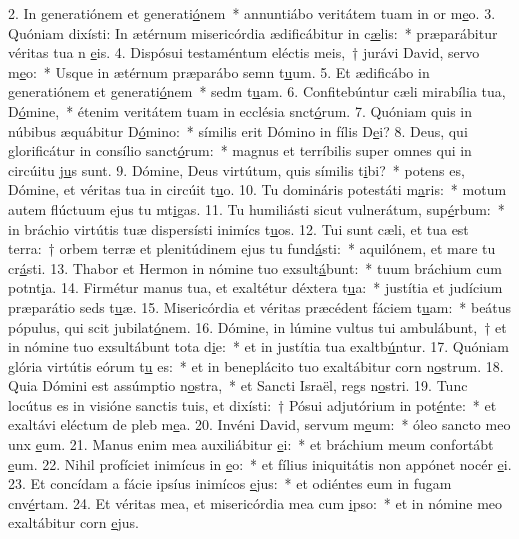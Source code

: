 2. In generatiónem et generati\uline{ó}nem~* annuntiábo veritátem tuam in or m\uline{e}o.
3. Quóniam dixísti: In ætérnum misericórdia ædificábitur in c\uline{æ}lis:~* præparábitur véritas tua n \uline{e}is.
4. Dispósui testaméntum eléctis meis,~† jurávi David, servo m\uline{e}o:~* Usque in ætérnum præparábo semn t\uline{u}um.
5. Et ædificábo in generatiónem et generati\uline{ó}nem~* sedm t\uline{u}am.
6. Confitebúntur cæli mirabília tua, D\uline{ó}mine,~* étenim veritátem tuam in ecclésia snct\uline{ó}rum.
7. Quóniam quis in núbibus æquábitur D\uline{ó}mino:~* símilis erit Dómino in fílis D\uline{e}i?
8. Deus, qui glorificátur in consílio sanct\uline{ó}rum:~* magnus et terríbilis super omnes qui in circúitu j\uline{u}s sunt.
9. Dómine, Deus virtútum, quis símilis t\uline{i}bi?~* potens es, Dómine, et véritas tua in circúit t\uline{u}o.
10. Tu domináris potestáti m\uline{a}ris:~* motum autem flúctuum ejus tu mt\uline{i}gas.
11. Tu humiliásti sicut vulnerátum, sup\uline{é}rbum:~* in bráchio virtútis tuæ dispersísti inimícs t\uline{u}os.
12. Tui sunt cæli, et tua est terra:~† orbem terræ et plenitúdinem ejus tu fund\uline{á}sti:~* aquilónem, et mare tu cr\uline{á}sti.
13. Thabor et Hermon in nómine tuo exsult\uline{á}bunt:~* tuum bráchium cum potnt\uline{i}a.
14. Firmétur manus tua, et exaltétur déxtera t\uline{u}a:~* justítia et judícium præparátio seds t\uline{u}æ.
15. Misericórdia et véritas præcédent fáciem t\uline{u}am:~* beátus pópulus, qui scit jubilat\uline{ó}nem.
16. Dómine, in lúmine vultus tui ambulábunt,~† et in nómine tuo exsultábunt tota d\uline{i}e:~* et in justítia tua exaltb\uline{ú}ntur.
17. Quóniam glória virtútis eórum t\uline{u} es:~* et in beneplácito tuo exaltábitur corn n\uline{o}strum.
18. Quia Dómini est assúmptio n\uline{o}stra,~* et Sancti Israël, regs n\uline{o}stri.
19. Tunc locútus es in visióne sanctis tuis, et dixísti:~† Pósui adjutórium in pot\uline{é}nte:~* et exaltávi eléctum de pleb m\uline{e}a.
20. Invéni David, servum m\uline{e}um:~* óleo sancto meo unx \uline{e}um.
21. Manus enim mea auxiliábitur \uline{e}i:~* et bráchium meum confortábt \uline{e}um.
22. Nihil profíciet inimícus in \uline{e}o:~* et fílius iniquitátis non appónet nocér \uline{e}i.
23. Et concídam a fácie ipsíus inimícos \uline{e}jus:~* et odiéntes eum in fugam cnv\uline{é}rtam.
24. Et véritas mea, et misericórdia mea cum \uline{i}pso:~* et in nómine meo exaltábitur corn \uline{e}jus.
